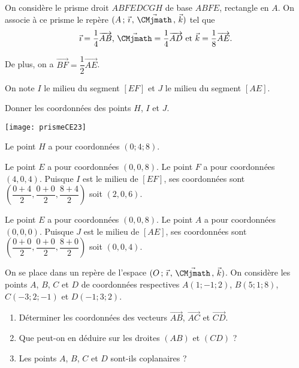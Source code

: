 \documentclass[11pt,fleqn, openany]{book} %
\begin{document}
\begin{exercise}[topic=geo03,subtitle={(Centres étrangers 2023)}]\hspace{0pt}
\begin{minipage}{0.65\linewidth}
On considère le prisme droit $ABFEDCGH$ de base $ABFE$, rectangle en $A$. On associe à ce prisme le repère $(A\,;\,\vec{\imath}\,,\,\vec{\CMjmath}\,,\,\vec{k})$ tel que \[\vec{\imath}=\dfrac{1}{4}\overrightarrow{AB}$, $\vec{\CMjmath}=\dfrac{1}{4}\overrightarrow{AD}$ et $\vec{k}=\dfrac{1}{8}\overrightarrow{AE}.\]

De plus, on a $\overrightarrow{BF}=\dfrac{1}{2}\overrightarrow{AE}$.

On note $I$ le milieu du segment $[EF]$ et $J$ le milieu du segment $[AE]$.

Donner les coordonnées des points $H$, $I$ et $J$.
\end{minipage}\hfill\begin{minipage}{0.33\linewidth}
\begin{center}
\texttt{[image: prismeCE23]}
\end{center}
\end{minipage}\end{exercise}

\begin{solution}
Le point $H$ a pour coordonnées $(0;4;8)$.

Le point $E$ a pour coordonnées $(0,0,8)$. Le point $F$ a pour coordonnées $(4,0,4)$. Puisque $I$ est le milieu de $[EF]$, ses coordonnées sont $\left(\dfrac{0+4}{2}, \dfrac{0+0}{2}, \dfrac{8+4}{2}\right)$ soit $(2,0,6)$.

Le point $E$ a pour coordonnées $(0,0,8)$. Le point $A$ a pour coordonnées $(0,0,0)$. Puisque $J$ est le milieu de $[AE]$, ses coordonnées sont $\left(\dfrac{0+0}{2}, \dfrac{0+0}{2}, \dfrac{8+0}{2}\right)$ soit $(0,0,4)$.
\end{solution}

\begin{exercise}[topic=geo03]On se place dans un repère de l'espace $\Oijk$. On considère les points $A$, $B$, $C$ et $D$ de coordonnées respectives $A(1;-1;2)$, $B(5;1;8)$, $C(-3;2;-1)$ et $D(-1;3;2)$.
\begin{enumerate}
\item Déterminer les coordonnées des vecteurs $\overrightarrow{AB}$, $\overrightarrow{AC}$ et $\overrightarrow{CD}$.
\item Que peut-on en déduire sur les droites $(AB)$ et $(CD)$ ?
\item Les points $A$, $B$, $C$ et $D$ sont-ils coplanaires ?
\end{enumerate}\end{exercise}
\end{document}
